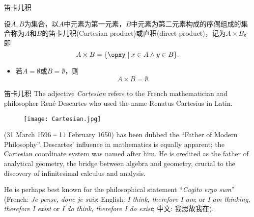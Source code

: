 \begin{frame}{笛卡儿积}
\pause
\begin{defi}
  设$A,B$为集合，以$A$中元素为第一元素，$B$中元素为第二元素构成的序偶组成的集合称为$A$和$B$的\alert{笛卡儿积(Cartesian product)}或\alert{直积(direct product)}，记为$A\times B$。即
  \[A\times B=\{\opxy\mid x\in A \land y\in B\}.\]
\end{defi}

\vspace{2ex}\pause

\begin{itemize}
  \item 若$A=\emptyset$或$B=\emptyset$，则
  \[A\times B=\emptyset.\]
\end{itemize}
\end{frame}


\begin{frame}[t]{笛卡儿积}
\pause
\vspace{1ex}
The adjective \emph{Cartesian} refers to the French mathematician and philosopher
Ren\'{e} Descartes who used the name Renatus Cartesius in Latin.
\vspace{1ex}\pause

\begin{minipage}[b]{0.2\textwidth}
\begin{figure}
  \centering
  \texttt{[image: Cartesian.jpg]}
\end{figure}
\end{minipage}
\hfill
\begin{minipage}[b]{0.7\textwidth}
  \hspace{2em} (31 March 1596 -- 11 February 1650) has been dubbed the ``Father of Modern Philosophy''.
  Descartes' influence in mathematics is equally apparent;
  the Cartesian coordinate system was named after him.
  He is credited as the father of analytical geometry,
  the bridge between algebra and geometry, crucial to the discovery of infinitesimal calculus and analysis.
\end{minipage}\pause

\vspace{0.75ex}
He is perhaps best known for the philosophical statement ``\emph{Cogito ergo sum}''
(French: \emph{Je pense, donc je suis}; English: \emph{I think, therefore I am}; or \emph{I am thinking,
therefore I exist} or \emph{I do think, therefore I do exist}; 中文: 我思故我在).
\end{frame}

